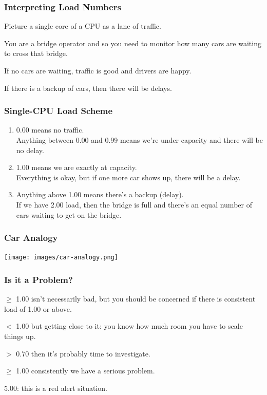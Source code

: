 \begin{frame}
\frametitle{Interpreting Load Numbers}



Picture a single core of a CPU as a lane of traffic. 

You are a bridge operator and so you need to monitor how many cars are waiting to cross that bridge. 

If no cars are waiting, traffic is good and drivers are happy. 

If there is a backup of cars, then there will be delays.


\end{frame}



\begin{frame}
\frametitle{Single-CPU Load Scheme}



\begin{enumerate}
	\item 0.00 means no traffic. \\
    Anything between 0.00 and 0.99 means we're under capacity and there will be no delay.\\[1em]
	\item 1.00 means we are exactly at capacity. \\
    Everything is okay, but if one more car shows up, there will be a delay.\\[1em]
	\item Anything above 1.00 means there's a backup (delay). \\
    If we have 2.00 load, then the bridge is full and there's an equal number of cars waiting to get on the bridge. 
\end{enumerate}


\end{frame}



\begin{frame}
\frametitle{Car Analogy}

\begin{center}
	\texttt{[image: images/car-analogy.png]}
\end{center}

\end{frame}



\begin{frame}
\frametitle{Is it a Problem?}



$\ge$ 1.00 isn't necessarily bad, but you should be concerned if there is consistent load of 1.00 or above. 

$<$ 1.00 but getting close to it: you know how much room you have to scale things up.

$>$ 0.70 then it's probably time to investigate.

$\ge$ 1.00 consistently we have a serious problem. 

5.00: this is a red alert situation.


\end{frame}



